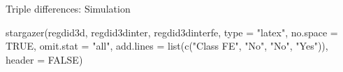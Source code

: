 \documentclass[
  ignorenonframetext,
]{beamer}
\newenvironment{Shaded}{\begin{snugshade}}{\end{snugshade}}
\newcommand{\AttributeTok}[1]{\textcolor[rgb]{0.77,0.63,0.00}{#1}}
\newcommand{\ConstantTok}[1]{\textcolor[rgb]{0.00,0.00,0.00}{#1}}
\newcommand{\FunctionTok}[1]{\textcolor[rgb]{0.00,0.00,0.00}{#1}}
\newcommand{\NormalTok}[1]{#1}
\newcommand{\StringTok}[1]{\textcolor[rgb]{0.31,0.60,0.02}{#1}}
\begin{document}
\begin{frame}[fragile]{Triple differences: Simulation}
\protect\hypertarget{triple-differences-simulation-3}{}
\tiny

\begin{Shaded}
\begin{Highlighting}[]
\FunctionTok{stargazer}\NormalTok{(regdid3d, regdid3dinter, regdid3dinterfe, }\AttributeTok{type =} \StringTok{"latex"}\NormalTok{,}
    \AttributeTok{no.space =} \ConstantTok{TRUE}\NormalTok{, }\AttributeTok{omit.stat =} \StringTok{"all"}\NormalTok{, }\AttributeTok{add.lines =} \FunctionTok{list}\NormalTok{(}\FunctionTok{c}\NormalTok{(}\StringTok{"Class FE"}\NormalTok{,}
        \StringTok{"No"}\NormalTok{, }\StringTok{"No"}\NormalTok{, }\StringTok{"Yes"}\NormalTok{)), }\AttributeTok{header =} \ConstantTok{FALSE}\NormalTok{)}
\end{Highlighting}
\end{Shaded}


\end{frame}
\end{document}
